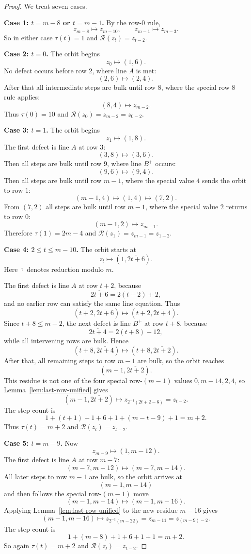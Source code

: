 \documentclass[11pt]{article}
\newcommand{\half}{2^{-1}}
\begin{document}
\begin{proof}
We treat seven cases.

\smallskip
\noindent\textbf{Case 1: $t=m-8$ or $t=m-1$.}
By the row-$0$ rule,
\[
z_{m-8}\mapsto z_{m-10},
\qquad
z_{m-1}\mapsto z_{m-3}.
\]
So in either case $\tau(t)=1$ and $\mathcal R(z_t)=z_{t-2}$.

\smallskip
\noindent\textbf{Case 2: $t=0$.}
The orbit begins
\[
z_0\mapsto (1,6).
\]
No defect occurs before row $2$, where line $A$ is met:
\[
(2,6)\mapsto (2,4).
\]
After that all intermediate steps are bulk until row $8$, where the special row
$8$ rule applies:
\[
(8,4)\mapsto z_{m-2}.
\]
Thus $\tau(0)=10$ and $\mathcal R(z_0)=z_{m-2}=z_{0-2}$.

\smallskip
\noindent\textbf{Case 3: $t=1$.}
The orbit begins
\[
z_1\mapsto (1,8).
\]
The first defect is line $A$ at row $3$:
\[
(3,8)\mapsto (3,6).
\]
Then all steps are bulk until row $9$, where line $B^+$ occurs:
\[
(9,6)\mapsto (9,4).
\]
Then all steps are bulk until row $m-1$, where the special value $4$ sends the
orbit to row $1$:
\[
(m-1,4)\mapsto (1,4)\mapsto (7,2).
\]
From $(7,2)$ all steps are bulk until row $m-1$, where the special value $2$
returns to row $0$:
\[
(m-1,2)\mapsto z_{m-1}.
\]
Therefore $\tau(1)=2m-4$ and $\mathcal R(z_1)=z_{m-1}=z_{1-2}$.

\smallskip
\noindent\textbf{Case 4: $2\le t\le m-10$.}
The orbit starts at
\[
z_t\mapsto (1,\overline{2t+6}).
\]
Here $\overline{\cdot}$ denotes reduction modulo $m$.

The first defect is line $A$ at row $t+2$, because
\[
\overline{2t+6}=2(t+2)+2,
\]
and no earlier row can satisfy the same line equation. Thus
\[
(t+2,\overline{2t+6})\mapsto (t+2,\overline{2t+4}).
\]
Since $t+8\le m-2$, the next defect is line $B^+$ at row $t+8$, because
\[
\overline{2t+4}=2(t+8)-12,
\]
while all intervening rows are bulk. Hence
\[
(t+8,\overline{2t+4})\mapsto (t+8,\overline{2t+2}).
\]
After that, all remaining steps to row $m-1$ are bulk, so the orbit reaches
\[
(m-1,\overline{2t+2}).
\]
This residue is not one of the four special row-$(m-1)$ values
$0,m-14,2,4$, so Lemma~\ref{lem:last-row-unified} gives
\[
(m-1,\overline{2t+2})\mapsto z_{\half(2t+2-6)} = z_{t-2}.
\]
The step count is
\[
1+(t+1)+1+6+1+(m-t-9)+1 = m+2.
\]
Thus $\tau(t)=m+2$ and $\mathcal R(z_t)=z_{t-2}$.

\smallskip
\noindent\textbf{Case 5: $t=m-9$.}
Now
\[
z_{m-9}\mapsto (1,m-12).
\]
The first defect is line $A$ at row $m-7$:
\[
(m-7,m-12)\mapsto (m-7,m-14).
\]
All later steps to row $m-1$ are bulk, so the orbit arrives at
\[
(m-1,m-14)
\]
and then follows the special row-$(m-1)$ move
\[
(m-1,m-14)\mapsto (m-1,m-16).
\]
Applying Lemma~\ref{lem:last-row-unified} to the new residue $m-16$ gives
\[
(m-1,m-16)\mapsto z_{\half(m-22)} = z_{m-11}=z_{(m-9)-2}.
\]
The step count is
\[
1+(m-8)+1+6+1+1 = m+2.
\]
So again $\tau(t)=m+2$ and $\mathcal R(z_t)=z_{t-2}$.


\end{proof}
\end{document}

